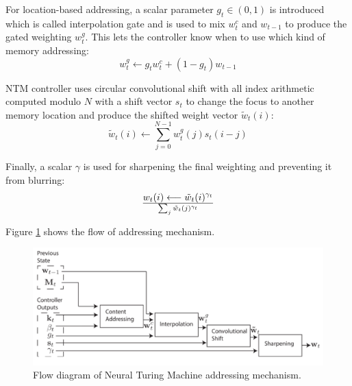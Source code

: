 \documentclass[acmsmall]{acmart}
\begin{document}
For location-based addressing, a scalar parameter $g_t \in (0,1)$ is introduced which is called interpolation gate and is used to mix $w_t^c$ and $w_{t-1}$ to produce the gated weighting $w_t^g$. This lets the controller know when to use which kind of memory addressing:
\begin{equation}
w_t^g \longleftarrow g_t w_t^c + (1-g_t)w_{t-1}
\end{equation}

NTM controller uses circular convolutional shift with all index arithmetic computed modulo $N$ with a shift vector $s_t$ to change the focus to another memory location and produce the shifted weight vector $\tilde{w}_t(i)$:
\begin{equation}
\tilde{w}_t(i) \longleftarrow \sum_{j=0}^{N-1} w_t^g(j)s_t(i-j)
\end{equation}

Finally, a scalar $\gamma$ is used for sharpening the final weighting and preventing it from blurring:
\begin{equation}
w_t(i) \longleftarrow {\tilde{w}_t(i)^{\gamma_t}} \over {\sum_{j} \tilde{w}_t(j)^{\gamma_t}}
\end{equation}

Figure \ref{fig:ntmaddressing} shows the flow of addressing mechanism.

\begin{figure}[h]
	\centering
	\includegraphics[scale=0.15]{figures/ntmaddressing}
	\caption{Flow diagram of Neural Turing Machine addressing mechanism.}
	\label{fig:ntmaddressing}
\end{figure}
\end{document}
